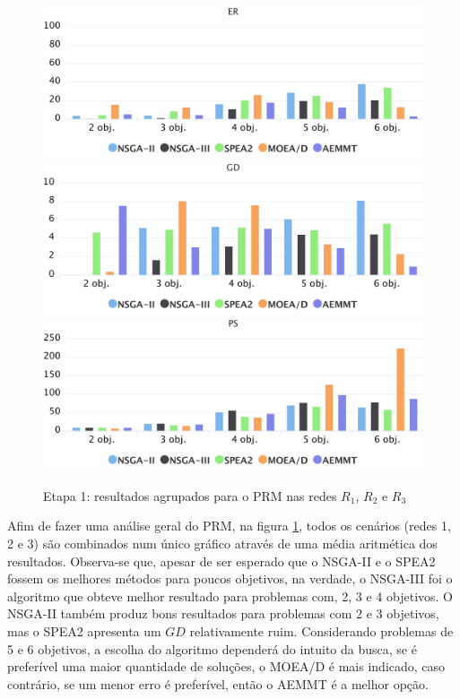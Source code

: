 \begin{figure}[!htbp]
	\caption{Etapa 1: resultados agrupados para o PRM nas redes $R_1$, $R_2$ e $R_3$}
	\label{fig_exp1_prm_todos}
	\includegraphics[width=1\textwidth]{cap_experimentos/figs/etapa1/er-mrp-todos}
	\includegraphics[width=1\textwidth]{cap_experimentos/figs/etapa1/gd-mrp-todos}
	\includegraphics[width=1\textwidth]{cap_experimentos/figs/etapa1/ps-mrp-todos}
\end{figure}

Afim de fazer uma análise geral do PRM, na figura \ref{fig_exp1_prm_todos}, todos os cenários (redes 1, 2 e 3) são combinados num único gráfico através de uma média aritmética dos resultados. Observa-se que, apesar de ser esperado que o NSGA-II e o SPEA2 fossem os melhores métodos para poucos objetivos, na verdade, o NSGA-III foi o algoritmo que obteve melhor resultado para problemas com, 2, 3 e 4 objetivos. O NSGA-II também produz bons resultados para problemas com 2 e 3 objetivos, mas o SPEA2 apresenta um $GD$ relativamente ruim. Considerando problemas de 5 e 6 objetivos, a escolha do algoritmo dependerá do intuito da busca, se é preferível uma maior quantidade de soluções, o MOEA/D é mais indicado, caso contrário, se um menor erro é preferível, então o AEMMT é a melhor opção.

